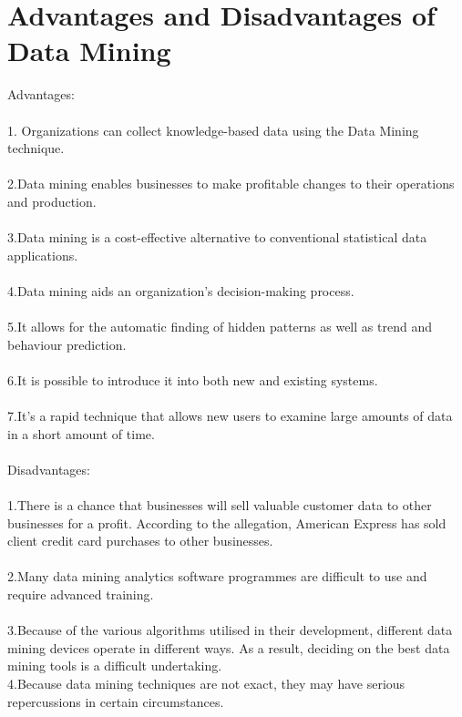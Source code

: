 \documentclass[12pt,letterpaper]{article}
\begin{document}
\section{Advantages and Disadvantages of Data Mining}
Advantages: \\
\\
1. Organizations can collect knowledge-based data using the Data Mining technique.\\
\\
2.Data mining enables businesses to make profitable changes to their operations and production.\\
\\
3.Data mining is a cost-effective alternative to conventional statistical data applications.\\
\\
4.Data mining aids an organization's decision-making process.\\
\\
5.It allows for the automatic finding of hidden patterns as well as trend and behaviour prediction.\\
\\
6.It is possible to introduce it into both new and existing systems.\\
\\
7.It's a rapid technique that allows new users to examine large amounts of data in a short amount of time.\\
\\
Disadvantages:\\
\\
1.There is a chance that businesses will sell valuable customer data to other businesses for a profit. According to the allegation, American Express has sold client credit card purchases to other businesses.\\
\\
2.Many data mining analytics software programmes are difficult to use and require advanced training.\\
\\
3.Because of the various algorithms utilised in their development, different data mining devices operate in different ways. As a result, deciding on the best data mining tools is a difficult undertaking.\\

4.Because data mining techniques are not exact, they may have serious repercussions in certain circumstances.
\end{document}
